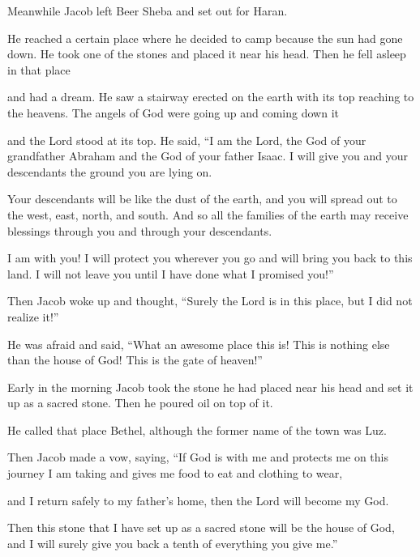 \begin{scripture}
 Meanwhile Jacob left Beer Sheba and set out for Haran.
 He reached a certain place where he decided to camp because the sun had gone down. He took one of the stones and placed it near his head. Then he fell asleep in that place
 and had a dream. He saw a stairway erected on the earth with its top reaching to the heavens. The angels of God were going up and coming down it
 and the Lord stood at its top. He said, ``I am the Lord, the God of your grandfather Abraham and the God of your father Isaac. I will give you and your descendants the ground you are lying on.
 Your descendants will be like the dust of the earth, and you will spread out to the west, east, north, and south. And so all the families of the earth may receive blessings through you and through your descendants.
 I am with you! I will protect you wherever you go and will bring you back to this land. I will not leave you until I have done what I promised you!''
\everypar{}

 Then Jacob woke up and thought, ``Surely the Lord is in this place, but I did not realize it!''
 He was afraid and said, ``What an awesome place this is! This is nothing else than the house of God! This is the gate of heaven!''
\everypar{}

 Early in the morning Jacob took the stone he had placed near his head and set it up as a sacred stone. Then he poured oil on top of it.
 He called that place Bethel, although the former name of the town was Luz.
 Then Jacob made a vow, saying, ``If God is with me and protects me on this journey I am taking and gives me food to eat and clothing to wear,
 and I return safely to my father's home, then the Lord will become my God.
 Then this stone that I have set up as a sacred stone will be the house of God, and I will surely give you back a tenth of everything you give me.''


\end{scripture}
